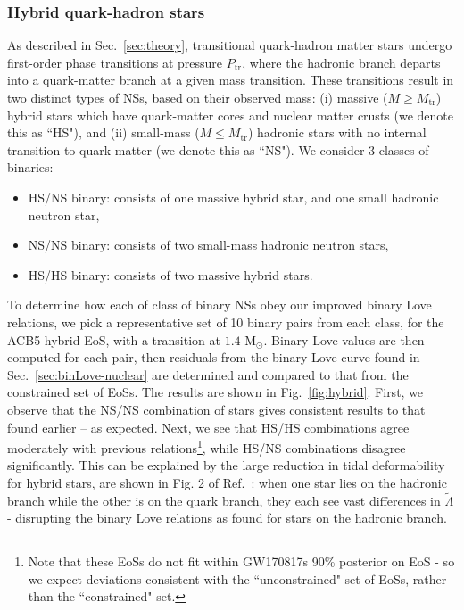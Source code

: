 \documentclass[prd,twocolumn,nofootinbib,superscriptaddress,amsmath,amssymb]{revtex4-1}
\begin{document}
\subsubsection{Hybrid quark-hadron stars}\label{sec:binLove-hybrid}
As described in Sec.~\ref{sec:theory}, transitional quark-hadron matter stars undergo first-order phase transitions at pressure $P_{\text{tr}}$, where the hadronic branch departs into a quark-matter branch at a given mass transition.
These transitions result in two distinct types of NSs, based on their observed mass: (i) massive ($M \geq M_{\text{tr}}$) hybrid stars which have quark-matter cores and nuclear matter crusts (we denote this as ``HS"), and (ii) small-mass ($M \leq M_{\text{tr}}$) hadronic stars with no internal transition to quark matter (we denote this as ``NS"). {} 
We consider 3 classes of binaries:
\begin{itemize}
\item HS/NS binary: consists of one massive hybrid star, and one small hadronic neutron star,
\item NS/NS binary: consists of two small-mass hadronic neutron stars,
\item HS/HS binary: consists of two massive hybrid stars.
\end{itemize}

To determine how each of class of binary NSs obey our improved binary Love relations, we pick a representative set of 10 binary pairs from each class, for the ACB5 hybrid EoS, with a transition at $1.4 \text{ M}_{\odot}$.
Binary Love values are then computed for each pair, then residuals from the binary Love curve found in Sec.~\ref{sec:binLove-nuclear} are determined and compared to that from the constrained set of EoSs.
The results are shown in Fig.~\ref{fig:hybrid}.
First, we observe that the NS/NS combination of stars gives consistent results to that found earlier -- as expected.
Next, we see that HS/HS combinations agree moderately with previous relations\footnote{Note that these EoSs do not fit within GW170817s 90\% posterior on EoS - so we expect deviations consistent with the ``unconstrained" set of EoSs, rather than the ``constrained" set.}, while HS/NS combinations disagree significantly.
This can be explained by the large reduction in tidal deformability for hybrid stars, are shown in Fig. 2 of Ref.~\cite{Paschalidis2018}: when one star lies on the hadronic branch while the other is on the quark branch, they each see vast differences in $\tilde{\Lambda}$ - disrupting the binary Love relations as found for stars on the hadronic branch. {}
\end{document}
